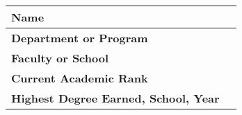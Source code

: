 \begin{center}
\begin{tabular}{|l|l|}
  \hline
  {\bf Name} & {\bf } \\
  \hline
  {\bf Department or Program} & {\bf } \\
  \hline
  {\bf Faculty or School} & {\bf } \\
  \hline
  {\bf Current Academic Rank} & {\bf } \\
  \hline
  {\bf Highest Degree Earned, School, Year} & {\bf } \\
  \hline
\end{tabular}

\end{center}

